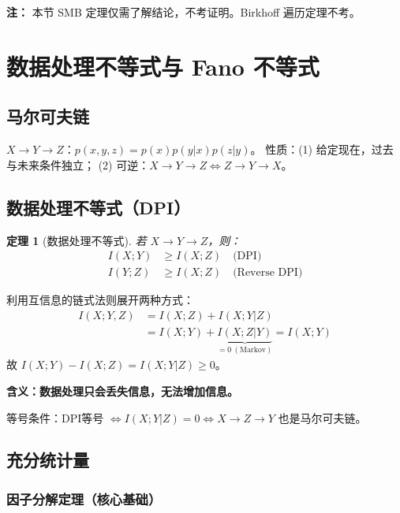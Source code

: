 \documentclass[12pt,a4paper]{ctexart}
\newtheorem{theorem}{定理}[section]
\theoremstyle{definition}
\begin{document}
\textbf{注：} 本节 SMB 定理仅需了解结论，不考证明。Birkhoff 遍历定理不考。

\section{数据处理不等式与 Fano 不等式}

\subsection{马尔可夫链}

$X \to Y \to Z$：$p(x,y,z) = p(x)p(y|x)p(z|y)$。
性质：(1) 给定现在，过去与未来条件独立；
(2) 可逆：$X \to Y \to Z \iff Z \to Y \to X$。

\subsection{数据处理不等式（DPI）}

\begin{theorem}[数据处理不等式]
若 $X \to Y \to Z$，则：
\begin{align*}
I(X;Y) &\geq I(X;Z) \quad\text{(DPI)}\\
I(Y;Z) &\geq I(X;Z) \quad\text{(Reverse DPI)}
\end{align*}
\end{theorem}

\begin{proofbox}[DPI证明]
利用互信息的链式法则展开两种方式：
\begin{align*}
I(X;Y,Z) &= I(X;Z) + I(X;Y|Z) \\
&= I(X;Y) + \underbrace{I(X;Z|Y)}_{=0\ (\text{Markov})} = I(X;Y)
\end{align*}
故 $I(X;Y) - I(X;Z) = I(X;Y|Z) \geq 0$。
\end{proofbox}

\textbf{含义：数据处理只会丢失信息，无法增加信息。}

等号条件：DPI等号 $\iff I(X;Y|Z)=0 \iff X \to Z \to Y$ 也是马尔可夫链。

\subsection{充分统计量}

\subsubsection{因子分解定理（核心基础）}
\end{document}
